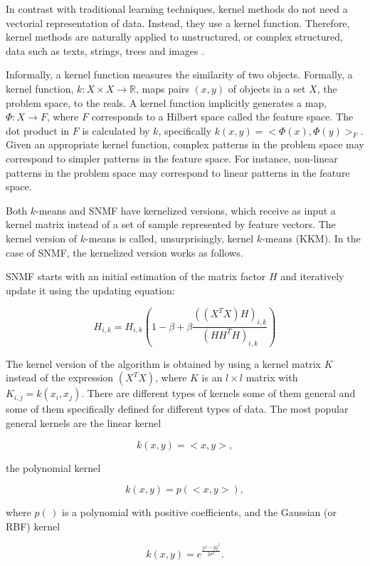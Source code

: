 \documentclass[letterpaper,12pt]{article}
\begin{document}
In contrast with traditional learning techniques, kernel methods do not need a vectorial representation of data. Instead, they use a kernel function. Therefore, kernel methods are naturally applied to unstructured, or complex structured, data such as texts, strings, trees and images \cite{shawe2004kernel}. 

Informally, a kernel function measures the similarity of two objects. Formally, a kernel function, $k:X\times X\rightarrow\mathbb{R}$,
maps pairs $(x,y)$ of objects in a set $X$, the problem space, to the reals. A kernel function implicitly generates a map, $\Phi:X\rightarrow F$, where $F$ corresponds to a Hilbert space called the feature space. The dot product in $F$ is calculated by $k$, specifically $k(x,y)=<\Phi(x),\Phi(y)>_{F}$. Given an appropriate kernel function, complex patterns in the problem space may correspond to simpler patterns in the feature space. For instance, non-linear patterns in the problem space may correspond to linear patterns in the feature space. 

Both $k$-means and SNMF have kernelized versions, which receive as input a kernel matrix instead of a set of sample represented by feature vectors. The kernel version of $k$-means is called, unsurprisingly, kernel $k$-means (KKM). In the case of SNMF, the kernelized version works as follows.

SNMF starts with an initial estimation of the matrix factor $H$ and iteratively update it using the updating equation:

\[
H_{i,k}=H_{i,k}(1-\beta+\beta\frac{((X^{T}X)H)_{i,k}}{(HH^{T}H)_{i,k}})
\]


The kernel version of the algorithm is obtained by using a kernel matrix $K$ instead of the expression $(X^{T}X)$, where $K$ is an
$l\times l$ matrix with $K_{i,j}=k(x_{i},x_{j}).$ There are different types of kernels some of them general and some of them specifically defined for different types of data. The most popular general kernels are the linear kernel 

\begin{equation}
k(x,y)=<x,y>,\label{eq:id-kernel}
\end{equation}

 the polynomial kernel 
 
\[
k(x,y)=p(<x,y>),
\]

 where $p(\,)$ is a polynomial with positive coefficients, and the Gaussian (or RBF) kernel 
 
\begin{equation}
k(x,y)=e^{\frac{\left\Vert x-y\right\Vert ^{2}}{2\sigma^{2}}}.\label{eq:Gaussian-kernel}
\end{equation}
\end{document}
